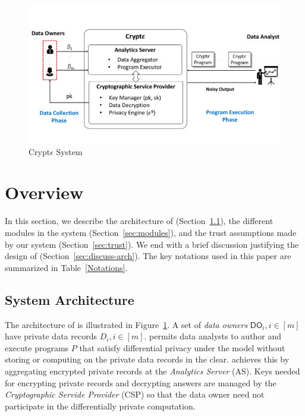 \begin{figure}[t]
	\includegraphics[width=0.9\columnwidth]{diag.pdf}\vspace{-5mm}
	\caption{\label{fig:system} Crypt$\epsilon$ System}%
\end{figure}


\section{\system Overview}\label{sec:overview}
In this section, we describe the architecture of \system (Section~\ref{sec:arch}), the different modules in the system (Section~\ref{sec:modules}), and the trust assumptions made by our system (Section~\ref{sec:trust}). We end with a brief discussion justifying the design of \system (Section~\ref{sec:discuss-arch}). The key notations used in this paper are summarized in Table~\ref{Notations}.

\subsection{System Architecture}\label{sec:arch}
The architecture of \system is illustrated in Figure~\ref{fig:system}. A set of \textit{data owners} ${\textsf{DO}_i, i\in [m]}$ have private data records ${D_i, i \in [m]}$. \system permits data analysts to author and execute programs $P$ that satisfy differential privacy under the \cdp model without storing or computing on the private data records in the clear. \system achieves this by aggregating encrypted private records at the \textit{Analytics Server} (\textsf{AS}). Keys needed for encrypting private records and decrypting answers are managed by the \textit{Cryptographic Servide Provider} (\textsf{CSP}) so that the data owner need not participate in the differentially private computation.

